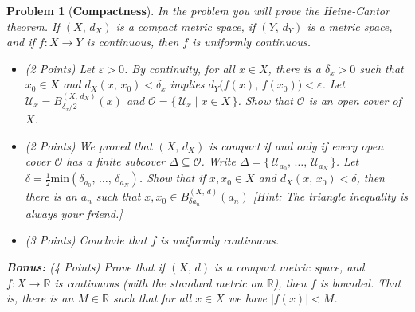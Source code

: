 \documentclass{article}
\theoremstyle{normal}
\newtheorem{problem}{Problem}
\begin{document}
\begin{problem}[\textbf{Compactness}]
        In the problem you will prove the \textit{Heine-Cantor theorem}.
        If $(X,\,d_{X})$ is a compact metric space, if $(Y,\,d_{Y})$ is a
        metric space, and if $f:X\rightarrow{Y}$ is continuous, then $f$ is
        uniformly continuous.
        \begin{itemize}
            \item (2 Points)
                Let $\varepsilon>0$. By continuity, for all $x\in{X}$, there
                is a $\delta_{x}>0$ such that $x_{0}\in{X}$ and
                $d_{X}(x,\,x_{0})<\delta_{x}$ implies
                $d_{Y}\big(f(x),\,f(x_{0})\big)<\varepsilon$.
                Let $\mathcal{U}_{x}=B_{\delta_{x}/2}^{(X,\,d_{X})}(x)$ and
                $\mathcal{O}=\{\,\mathcal{U}_{x}\;|\;x\in{X}\,\}$. Show that
                $\mathcal{O}$ is an open cover of $X$.
            \item (2 Points) We proved that $(X,\,d_{X})$ is compact
                if and only if every
                open cover $\mathcal{O}$ has a finite subcover
                $\Delta\subseteq\mathcal{O}$. Write
                $\Delta=\{\,\mathcal{U}_{a_{0}},\,\dots,\,\mathcal{U}_{a_{N}}\,\}$.
                Let
                $\delta=\frac{1}{2}\textrm{min}(\delta_{a_{0}},\,\dots,\,\delta_{a_{N}})$.
                Show that if $x,x_{0}\in{X}$ and
                $d_{X}(x,\,x_{0})<\delta$, then there is an
                $a_{n}$ such that $x,x_{0}\in{B}_{\delta{a}_{n}}^{(X,\,d)}(a_{n})$
                [Hint: The triangle inequality is always your friend.]
            \item (3 Points) Conclude that $f$ is uniformly continuous.
        \end{itemize}
        \textbf{Bonus:} (4 Points) Prove that if $(X,\,d)$ is a compact metric
        space, and $f:X\rightarrow\mathbb{R}$ is continuous (with the standard
        metric on $\mathbb{R}$), then $f$ is bounded. That is, there is an
        $M\in\mathbb{R}$ such that for all $x\in{X}$ we have
        $|f(x)|<M$.
    \end{problem}
    \clearpage
\end{document}
